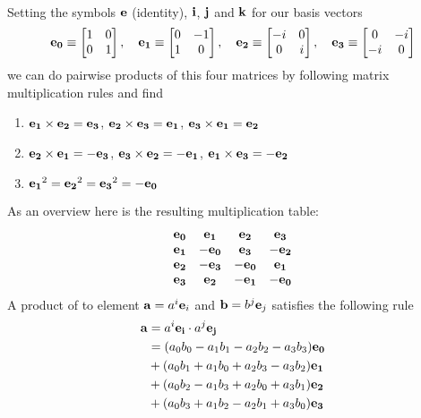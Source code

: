 \documentclass[11pt, oneside]{article}   	%
\begin{document}
\\
%
Setting the symbols $\mathbf{e}$ (identity), $\mathbf{i}$, $\mathbf{j}$ and $\mathbf{k}$ for our basis vectors
\begin{equation}
\mathbf{e_0} \equiv
\begin{bmatrix}
	1 & 0 \\
	0 & 1
\end{bmatrix}
,\quad
\mathbf{e_1} \equiv
\begin{bmatrix}
	0 & -1 \\
	1 & 0
\end{bmatrix}
,\quad
\mathbf{e_2} \equiv
\begin{bmatrix}
	-i & 0 \\
	0 & i
\end{bmatrix}
,\quad
\mathbf{e_3} \equiv
\begin{bmatrix}
	0 & -i \\
	-i & 0
\end{bmatrix}
\end{equation}
%
we can do pairwise products of this four matrices by following matrix multiplication rules and find \\
\begin{enumerate}
  \item $\mathbf{e_1} \times \mathbf{e_2} = \mathbf{e_3}$, $\mathbf{e_2} \times \mathbf{e_3} = \mathbf{e_1}$, $\mathbf{e_3} \times \mathbf{e_1} = \mathbf{e_2}$
  \item $\mathbf{e_2} \times \mathbf{e_1} = -\mathbf{e_3}$, $\mathbf{e_3} \times \mathbf{e_2} = -\mathbf{e_1}$, $\mathbf{e_1} \times \mathbf{e_3} = -\mathbf{e_2}$
  \item $\mathbf{e_1}^2 = \mathbf{e_2}^2 = \mathbf{e_3}^2 = -\mathbf{e_0}$
\end{enumerate}
%
As an overview here is the resulting multiplication table:
\begin{equation}
\begin{matrix}
	\mathbf{e_0} &  \mathbf{e_1} &  \mathbf{e_2} &  \mathbf{e_3} \\
	\mathbf{e_1} & -\mathbf{e_0} &  \mathbf{e_3} & -\mathbf{e_2} \\
	\mathbf{e_2} & -\mathbf{e_3} & -\mathbf{e_0} &  \mathbf{e_1} \\
	\mathbf{e_3} &  \mathbf{e_2} & -\mathbf{e_1} & -\mathbf{e_0} \\
\end{matrix}
\end{equation}
%
A product of to element $\mathbf{a} = a^i \mathbf{e}_i$ and $\mathbf{b} = b^j \mathbf{e}_j$ satisfies the following rule
\begin{subequations}
\begin{align*}
	\mathbf{a} &= a^i \mathbf{e_i} \cdot a^j \mathbf{e_j} \\
	&= (a_0b_0 - a_1b_1 - a_2b_2 - a_3b_3) \mathbf{e_0} \\
	&+ (a_0b_1 + a_1b_0 + a_2b_3 - a_3b_2) \mathbf{e_1} \\
	&+ (a_0b_2 - a_1b_3 + a_2b_0 + a_3b_1) \mathbf{e_2} \\
	&+ (a_0b_3 + a_1b_2 - a_2b_1 + a_3b_0) \mathbf{e_3} 
\end{align*}
\end{subequations}
\end{document}
